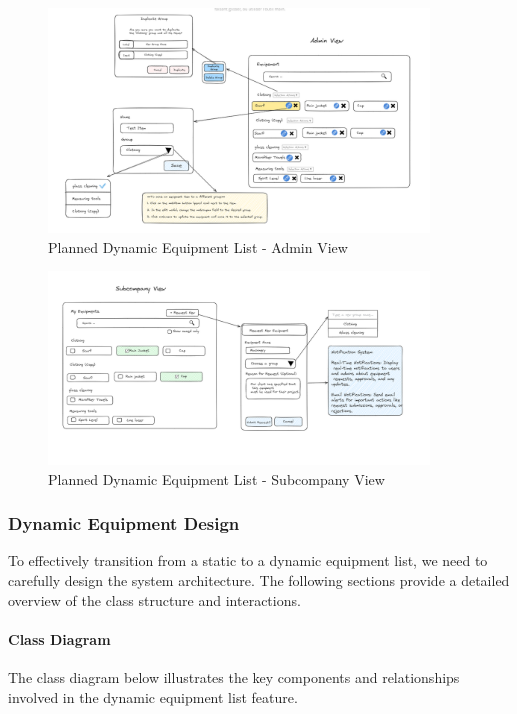     \begin{figure}[H]
        \centering
        \includegraphics[width=0.9\textwidth]{src/assets/chapters/DynamicEquipementAdmin.PNG}
        \caption{Planned Dynamic Equipment List - Admin View}
        \label{fig:dynamic_equipment_list_admin}
    \end{figure}
    
    \begin{figure}[H]
        \centering
        \includegraphics[width=0.9\textwidth]{src/assets/chapters/DynamicEquipementSubcompany.PNG}
        \caption{Planned Dynamic Equipment List - Subcompany View}
        \label{fig:dynamic_equipment_list_subcompany}
    \end{figure}
    \subsubsection{Dynamic Equipment Design}
To effectively transition from a static to a dynamic equipment list, we need to carefully design the system architecture. The following sections provide a detailed overview of the class structure and interactions.

\paragraph{Class Diagram}
The class diagram below illustrates the key components and relationships involved in the dynamic equipment list feature.

